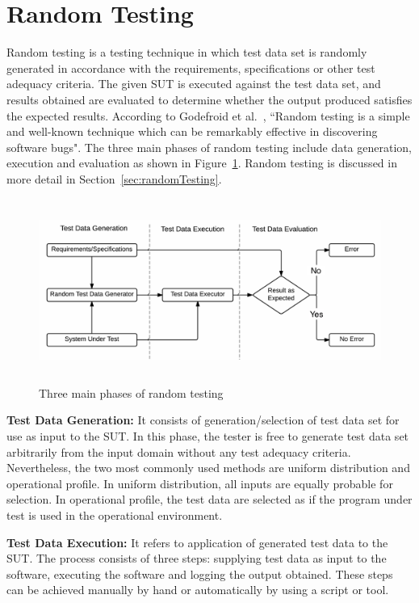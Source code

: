  

\section{Random Testing} \label{sec:RT_1}
Random testing is a testing technique in which test data set is randomly generated in accordance with the requirements, specifications or other test adequacy criteria. The given SUT is executed against the test data set, and results obtained are evaluated to determine whether the output produced satisfies the expected results. According to Godefroid et al.~\cite{godefroid2005dart}, ``Random testing is a simple and well-known technique which can be remarkably effective in discovering software bugs". The three main phases of random testing include data generation, execution and evaluation as shown in Figure~\ref{fig:SoftwareTesting1}. Random testing is discussed in more detail in Section~\ref{sec:randomTesting}.
\bigskip
\begin{figure}[H]
	\centering
		\includegraphics[width=15cm, height=6cm ]{chapter1/randomTestingPhases1.png}
		\caption{Three main phases of random testing}
	\label{fig:SoftwareTesting1}
\end{figure}

\textbf{Test Data Generation:} It consists of generation/selection of test data set for use as input to the SUT. In this phase, the tester is free to generate test data set arbitrarily from the input domain without any test adequacy criteria. Nevertheless, the two most commonly used methods are uniform distribution and operational profile. In uniform distribution, all inputs are equally probable for selection. In operational profile, the test data are selected as if the program under test is used in the operational environment.

\textbf{Test Data Execution:} It refers to application of generated test data to the SUT. The process consists of three steps: supplying test data as input to the software, executing the software and logging the output obtained. 
These steps can be achieved manually by hand or automatically by using a script or tool. 

